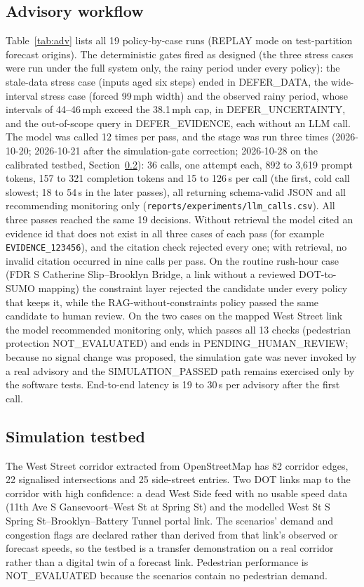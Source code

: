 \subsection{Advisory workflow}
Table~\ref{tab:adv} lists all 19 policy-by-case runs (REPLAY mode on test-partition forecast origins). The deterministic
gates fired as designed (the three stress cases were run under the full system only, the rainy period under every
policy): the stale-data stress case (inputs aged six steps) ended in DEFER\_DATA,
the wide-interval stress case (forced 99\,mph width) and the observed rainy period, whose intervals of 44--46\,mph exceed
the 38.1\,mph cap, in DEFER\_UNCERTAINTY, and the out-of-scope query in DEFER\_EVIDENCE, each without an LLM call. The
model was called 12 times per pass, and the stage was run three times (2026-10-20; 2026-10-21 after the
simulation-gate correction; 2026-10-28 on the calibrated testbed, Section~\ref{sec:res:sim}): 36 calls, one attempt
each, 892 to 3{,}619 prompt tokens, 157 to 321 completion tokens and 15 to 126\,s per call (the first, cold call
slowest; 18 to 54\,s in the later passes), all returning schema-valid JSON and all recommending monitoring only
(\texttt{reports/experiments/llm\_calls.csv}). All three passes reached the same 19 decisions. Without retrieval the model cited an evidence id that does not exist in all three cases of each pass (for
example \texttt{EVIDENCE\_123456}), and the citation check rejected every one; with retrieval, no invalid citation
occurred in nine calls per pass. On the routine rush-hour case (FDR S Catherine Slip--Brooklyn Bridge, a link
without a reviewed DOT-to-SUMO mapping) the constraint layer rejected the candidate under every policy that keeps it,
while the RAG-without-constraints policy passed the same candidate to human review. On the two cases on the mapped
West Street link the model recommended monitoring only, which passes all 13 checks (pedestrian protection
NOT\_EVALUATED) and ends in PENDING\_HUMAN\_REVIEW; because no signal change was proposed, the simulation gate was
never invoked by a real advisory and the SIMULATION\_PASSED path remains exercised only by the software tests.
End-to-end latency is 19 to 30\,s per advisory after the first call.

\subsection{Simulation testbed}
\label{sec:res:sim}
The West Street corridor extracted from OpenStreetMap has 82 corridor edges, 22 signalised intersections and 25
side-street entries. Two DOT links map to the corridor with high confidence: a dead West Side feed with no usable speed
data (11th Ave S Gansevoort--West St at Spring St) and the modelled West St S Spring St--Brooklyn--Battery Tunnel portal
link. The scenarios' demand and congestion flags are declared rather than derived from that link's observed or
forecast speeds, so the testbed is a transfer demonstration on a real corridor rather than a digital twin of a
forecast link. Pedestrian performance is NOT\_EVALUATED because the scenarios contain no pedestrian demand.

